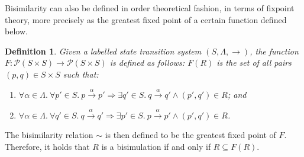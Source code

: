 \documentclass[10pt,a4paper]{article}
\newcommand{\tran}[3]{#1 \overset{#2}{\longrightarrow} #3}
\newtheorem{definition}{Definition}
\begin{document}
Bisimilarity can also be defined in order theoretical fashion, in terms of fixpoint theory, more precisely as the greatest fixed point of a certain function defined below.

\begin{definition}
Given a labelled state transition system $(S, \Lambda, \rightarrow)$, the function $F : \mathcal{P}(S \times S) \rightarrow \mathcal{P}(S \times S)$ is defined as follows: $F(R)$ is the set of all pairs $(p, q) \in S \times S$ such that:
\begin{enumerate}
\item $\forall \alpha \in \Lambda. \: \forall p' \in S. \: \tran{p}{\alpha}{p'} \Longrightarrow \exists q' \in S. \: \tran{q}{\alpha}{q'} \wedge (p',q') \in R$; and
\item $\forall \alpha \in \Lambda. \: \forall q' \in S. \: \tran{q}{\alpha}{q'} \Longrightarrow \exists p' \in S. \: \tran{p}{\alpha}{p'} \wedge (p',q') \in R$.
\end{enumerate}
\end{definition}

The bisimilarity relation $\sim$ is then defined to be the greatest fixed point of $F$. Therefore, it holds that $R$ is a bisimulation if and only if $R \subseteq F(R)$.
\end{document}

